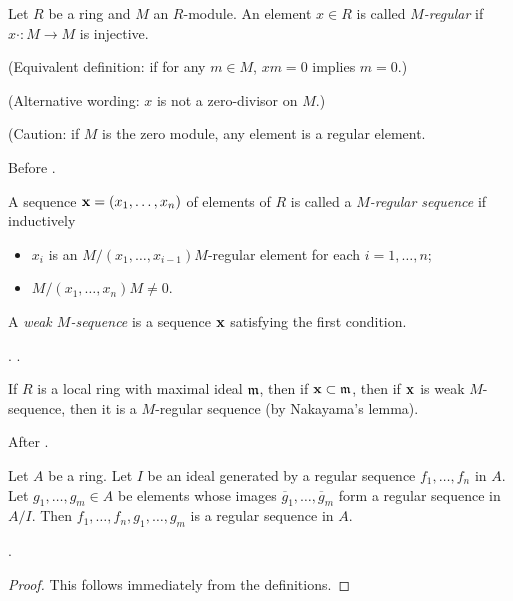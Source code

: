 	\begin{definition}
		Let $R$ be a ring and $M$ an $R$-module. An element $x \in R$ is called \emph{$M$-regular} if $x \cdot : M \to M$ is injective. 
		
		(Equivalent definition: if for any $m \in M$, $xm=0$ implies $m=0$.) 
		
		(Alternative wording: $x$ is not a zero-divisor on $M$.)
		
		(Caution: if $M$ is the zero module, any element is a regular element.
		
		Before \cite[Definition 1.1.1]{BH}.
	\end{definition}
	
	\begin{definition}
		A sequence $\mathbf{x}  = (x_1, \dots, x_n)$ of elements of $R$ is called a \emph{$M$-regular sequence} if inductively
		\begin{itemize}
			\item $x_i$ is an $M/(x_1, \dots, x_{i-1})M$-regular element for each $i=1, \dots, n$;
			\item $M/ (x_1, \dots, x_n)M \neq 0$.
		\end{itemize}
		A \emph{weak $M$-sequence} is a sequence $\mathbf{x}$ satisfying the first condition.
		
		\cite[Definition 1.1.1]{BH}. \cite[(15.A)]{matsumura-ring}.
		
	\end{definition}
	
	\begin{remark}
		If $R$ is a local ring with maximal ideal $\mathfrak{m}$, then if $\mathbf{x} \subset \mathfrak{m}$, then if $\mathbf{x}$ is weak $M$-sequence, then it is a $M$-regular sequence (by Nakayama's lemma).
		
		After \cite[Definition 1.1.1]{BH}.
	\end{remark}
	
	\begin{lemma}
		\label{lemma-join-regular-sequences}
		Let $A$ be a ring. Let $I$ be an ideal generated by a regular
		sequence $f_1, \ldots, f_n$ in $A$. Let $g_1, \ldots, g_m \in A$ be
		elements whose images $\overline{g}_1, \ldots, \overline{g}_m$ form a
		regular sequence in $A/I$. Then $f_1, \ldots, f_n, g_1, \ldots, g_m$
		is a regular sequence in $A$.
		
		\cite[Lemma 065K]{stacks-project}.
	\end{lemma}
	
	\begin{proof}
		This follows immediately from the definitions.
	\end{proof}
	
